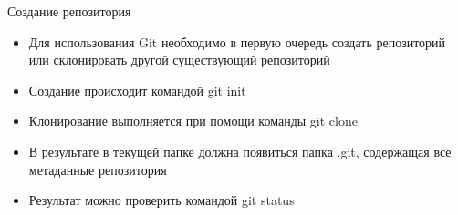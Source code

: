 \begin{frame}{Создание репозитория}
    \begin{itemize}
        \item
              Для использования Git необходимо в первую очередь создать репозиторий или склонировать другой существующий репозиторий
        \item
              Создание происходит командой git init
        \item
              Клонирование выполняется при помощи команды git clone
        \item
              В результате в текущей папке должна появиться папка .git, содержащая все метаданные репозитория
        \item
              Результат можно проверить командой git status
    \end{itemize}
\end{frame}